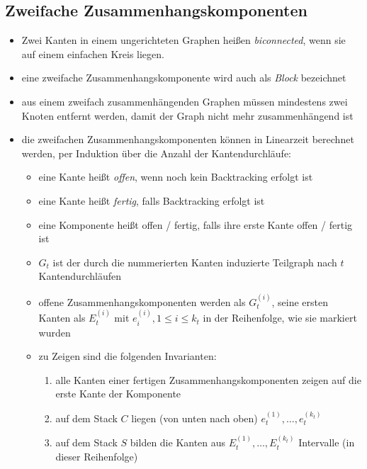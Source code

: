 \subsection{Zweifache Zusammenhangskomponenten}
\begin{itemize}[itemsep=-1pt]
	\item Zwei Kanten in einem ungerichteten Graphen heißen \textit{biconnected}, wenn sie auf einem einfachen Kreis liegen.
	\item eine zweifache Zusammenhangskomponente wird auch als \textit{Block} bezeichnet
	\item aus einem zweifach zusammenhängenden Graphen müssen mindestens zwei Knoten entfernt werden, damit der Graph nicht mehr zusammenhängend ist
	\item die zweifachen Zusammenhangskomponenten können in Linearzeit berechnet werden,\algobreak{}
	\vspace*{-1.25\baselineskip}
	\ProofIdea
		\vspace*{-1\baselineskip}
		per Induktion über die Anzahl der Kantendurchläufe:
			\begin{itemize}[itemsep=-1pt]
				\item eine Kante heißt \textit{offen}, wenn noch kein Backtracking erfolgt ist
				\item eine Kante heißt \textit{fertig}, falls Backtracking erfolgt ist
				\item eine Komponente heißt offen / fertig, falls ihre erste Kante offen / fertig ist
				\item $G_t$ ist der durch die nummerierten Kanten induzierte Teilgraph nach $t$ Kantendurchläufen
				\item offene Zusammenhangskomponenten werden als $G_t^{(i)}$, seine ersten Kanten als $E_t^{(i)}$ mit $e_i^{(i)}, 1\leq i\leq k_t$ in der Reihenfolge, wie sie markiert wurden
				\item zu Zeigen sind die folgenden Invarianten:
					\begin{enumerate}[itemsep=-1pt]
						\item alle Kanten einer fertigen Zusammenhangskomponenten zeigen auf die erste Kante der Komponente
						\item auf dem Stack $C$ liegen (von unten nach oben) $e_t^{(1)},\dots,e_t^{(k_t)}$
						\item auf dem Stack $S$ bilden die Kanten aus $E_t^{(1)},\dots,E_t^{(k_t)}$ Intervalle (in dieser Reihenfolge)
					\end{enumerate}
			\end{itemize}
\end{itemize}
